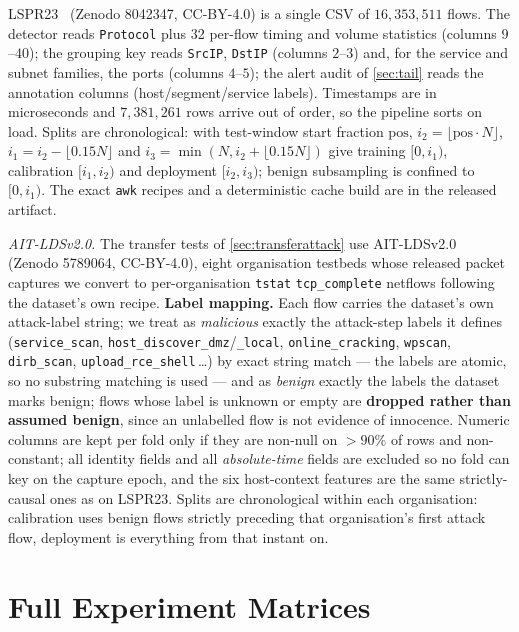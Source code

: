 \documentclass[conference]{IEEEtran}
\begin{document}
LSPR23~\cite{lspr23} (Zenodo 8042347, CC-BY-4.0) is a single CSV of $16{,}353{,}511$ flows. The
detector reads \texttt{Protocol} plus 32 per-flow timing and volume statistics (columns $9$--$40$);
the grouping key reads \texttt{SrcIP}, \texttt{DstIP} (columns $2$--$3$) and, for the service and
subnet families, the ports (columns $4$--$5$); the alert audit of \cref{sec:tail} reads the
annotation columns (host/segment/service labels). Timestamps are in microseconds and $7{,}381{,}261$
rows arrive out of order, so the pipeline sorts on load. Splits are chronological: with test-window
start fraction $\mathrm{pos}$, $i_2=\lfloor\mathrm{pos}\cdot N\rfloor$, $i_1=i_2-\lfloor0.15N\rfloor$
and $i_3=\min(N,i_2+\lfloor0.15N\rfloor)$ give training $[0,i_1)$, calibration $[i_1,i_2)$ and
deployment $[i_2,i_3)$; benign subsampling is confined to $[0,i_1)$. The exact \texttt{awk} recipes
and a deterministic cache build are in the released artifact.

\emph{AIT-LDSv2.0.} The transfer tests of \cref{sec:transferattack} use
AIT-LDSv2.0~\cite{aitlds} (Zenodo 5789064, CC-BY-4.0), eight organisation testbeds whose released
packet captures we convert to per-organisation \texttt{tstat} \texttt{tcp\_complete} netflows
following the dataset's own recipe. \textbf{Label mapping.} Each flow carries the dataset's own
attack-label string; we treat as \emph{malicious} exactly the attack-step labels it defines
(\texttt{service\_scan}, \texttt{host\_discover\_dmz}/\texttt{\_local}, \texttt{online\_cracking},
\texttt{wpscan}, \texttt{dirb\_scan}, \texttt{upload\_rce\_shell}\,\ldots) by exact string match --- the labels
are atomic, so no substring matching is used --- and as \emph{benign} exactly the labels the dataset
marks benign; flows whose label is unknown or empty are \textbf{dropped rather than assumed benign},
since an unlabelled flow is not evidence of innocence. Numeric columns are kept per fold only if they
are non-null on $>\!90\%$ of rows and non-constant; all identity fields and all \emph{absolute-time}
fields are excluded so no fold can key on the capture epoch, and the six host-context features are the
same strictly-causal ones as on LSPR23. Splits are chronological within each organisation:
calibration uses benign flows strictly preceding that organisation's first attack flow, deployment is
everything from that instant on.
\section{Full Experiment Matrices}\label{app:matrices}
\end{document}
